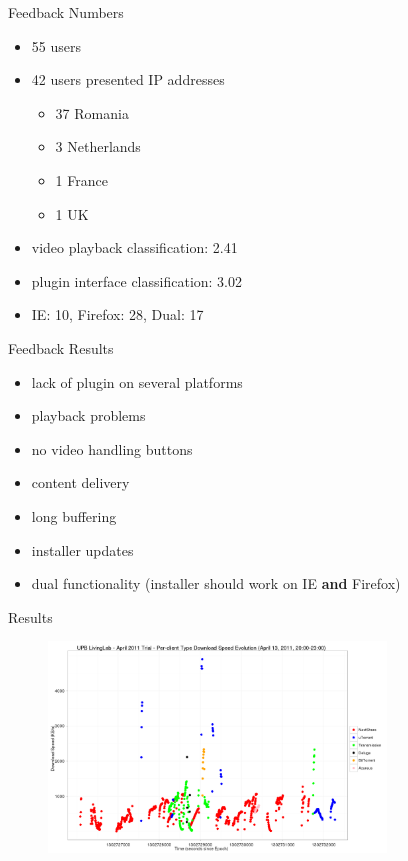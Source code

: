 \documentclass{beamer}
\begin{document}
\begin{frame}{Feedback Numbers}
  \begin{itemize}
    \item 55 users
    \item 42 users presented IP addresses
      \begin{itemize}
        \item 37 Romania
        \item 3 Netherlands
        \item 1 France
        \item 1 UK
      \end{itemize}
    \item video playback classification: 2.41
    \item plugin interface classification: 3.02
    \item IE: 10, Firefox: 28, Dual: 17
  \end{itemize}
\end{frame}

\begin{frame}{Feedback Results}
  \begin{itemize}
    \item lack of plugin on several platforms
    \item playback problems
    \item no video handling buttons
    \item content delivery
    \item long buffering
    \item installer updates
    \item dual functionality (installer should work on IE \textbf{and} Firefox)
  \end{itemize}
\end{frame}

\begin{frame}{Results}
  \begin{figure}
    \includegraphics[width=0.8\textwidth]{img/ll-trial}
  \end{figure}
\end{frame}
\end{document}
